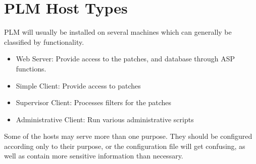 \section {PLM Host Types}

PLM will usually be installed on several machines which can generally be classified by functionality.

\begin{itemize}
\item Web Server:  Provide access to the patches, and database through ASP functions.
\item Simple Client: Provide access to patches
\item Supervisor Client: Processes filters for the patches
\item Administrative Client: Run various administrative scripts
\end{itemize}

Some of the hosts may serve more than one purpose.  They should be configured according only to their purpose, or the configuration file will get confusing, as well as contain more sensitive information than necessary.

